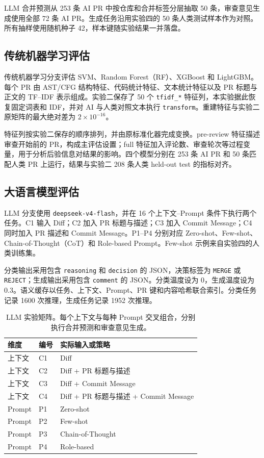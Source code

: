 \documentclass{experimentreport}
\begin{document}
{LLM 合并预测从 253 条 AI PR 中按仓库和合并标签分层抽取 50 条，审查意见生成使用全部 72 条 AI PR。生成任务沿用实验四的 50 条人类测试样本作为对照。所有抽样使用随机种子 42，样本键随实验结果一并落盘。

\subsection{传统机器学习评估}

传统机器学习分支评估 SVM、Random Forest（RF）、XGBoost 和 LightGBM。每个 PR 由 AST/CFG 结构特征、代码统计特征、文本统计特征以及 PR 标题与正文的 TF--IDF 表示组成。实验二保存了 50 个 \texttt{tfidf\_*} 特征列，本实验据此恢复固定词表和 IDF，并对 AI 与人类对照文本执行 \texttt{transform}。重建特征与实验二原矩阵的最大绝对差为 $2\times10^{-16}$。

特征列按实验二保存的顺序排列，并由原标准化器完成变换。pre-review 特征描述审查开始前的 PR，构成主评估设置；full 特征加入评论数、审查轮次等过程变量，用于分析后验信息对结果的影响。四个模型分别在 253 条 AI PR 和 50 条匹配人类 PR 上运行，结果与实验二 208 条人类 held-out test 的指标对齐。

\subsection{大语言模型评估}

LLM 分支使用 \texttt{deepseek-v4-flash}，并在 16 个上下文--Prompt 条件下执行两个任务。C1 输入 Diff；C2 加入 PR 标题与描述；C3 加入 Commit Message；C4 同时加入 PR 描述和 Commit Message。P1--P4 分别对应 Zero-shot、Few-shot、Chain-of-Thought（CoT）和 Role-based Prompt。Few-shot 示例来自实验四的人类训练集。

分类输出采用包含 \texttt{reasoning} 和 \texttt{decision} 的 JSON，决策标签为 \texttt{MERGE} 或 \texttt{REJECT}；生成输出采用包含 \texttt{comment} 的 JSON。分类温度设为 0，生成温度设为 0.3。语义缓存以任务、上下文、Prompt、PR 键和内容哈希联合索引。分类任务记录 1600 次推理，生成任务记录 1952 次推理。

\begin{table}[H]
\centering
\caption{LLM 实验矩阵。每个上下文与每种 Prompt 交叉组合，分别执行合并预测和审查意见生成。}
\small
\begin{tabular}{lll}
\toprule
维度 & 编号 & 实际输入或策略 \\
\midrule
上下文 & C1 & Diff \\
上下文 & C2 & Diff + PR 标题与描述 \\
上下文 & C3 & Diff + Commit Message \\
上下文 & C4 & Diff + PR 标题与描述 + Commit Message \\
\midrule
Prompt & P1 & Zero-shot \\
Prompt & P2 & Few-shot \\
Prompt & P3 & Chain-of-Thought \\
Prompt & P4 & Role-based \\
\bottomrule
\end{tabular}
\end{table}

}
\end{document}
